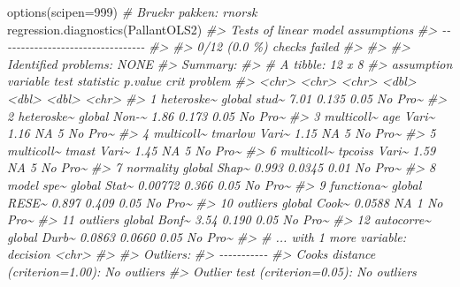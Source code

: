 \documentclass[
]{article}
\newenvironment{Shaded}{\begin{snugshade}}{\end{snugshade}}
\newcommand{\AttributeTok}[1]{\textcolor[rgb]{0.77,0.63,0.00}{#1}}
\newcommand{\CommentTok}[1]{\textcolor[rgb]{0.56,0.35,0.01}{\textit{#1}}}
\newcommand{\DecValTok}[1]{\textcolor[rgb]{0.00,0.00,0.81}{#1}}
\newcommand{\FunctionTok}[1]{\textcolor[rgb]{0.00,0.00,0.00}{#1}}
\newcommand{\NormalTok}[1]{#1}
\begin{document}
\begin{Shaded}
\begin{Highlighting}[]
\FunctionTok{options}\NormalTok{(}\AttributeTok{scipen=}\DecValTok{999}\NormalTok{)}
\CommentTok{\# Bruekr pakken: rnorsk}
\FunctionTok{regression.diagnostics}\NormalTok{(PallantOLS2)}
\CommentTok{\#\textgreater{} Tests of linear model assumptions}
\CommentTok{\#\textgreater{} {-}{-}{-}{-}{-}{-}{-}{-}{-}{-}{-}{-}{-}{-}{-}{-}{-}{-}{-}{-}{-}{-}{-}{-}{-}{-}{-}{-}{-}{-}{-}{-}{-}}
\CommentTok{\#\textgreater{} }
\CommentTok{\#\textgreater{} 0/12 (0.0 \%) checks failed}
\CommentTok{\#\textgreater{} }
\CommentTok{\#\textgreater{} }
\CommentTok{\#\textgreater{} Identified problems: NONE}
\CommentTok{\#\textgreater{} Summary:}
\CommentTok{\#\textgreater{} \# A tibble: 12 x 8}
\CommentTok{\#\textgreater{}    assumption variable test  statistic p.value  crit problem}
\CommentTok{\#\textgreater{}    \textless{}chr\textgreater{}      \textless{}chr\textgreater{}    \textless{}chr\textgreater{}     \textless{}dbl\textgreater{}   \textless{}dbl\textgreater{} \textless{}dbl\textgreater{} \textless{}chr\textgreater{}  }
\CommentTok{\#\textgreater{}  1 heteroske\textasciitilde{} global   stud\textasciitilde{}   7.01     0.135   0.05 No Pro\textasciitilde{}}
\CommentTok{\#\textgreater{}  2 heteroske\textasciitilde{} global   Non{-}\textasciitilde{}   1.86     0.173   0.05 No Pro\textasciitilde{}}
\CommentTok{\#\textgreater{}  3 multicoll\textasciitilde{} age      Vari\textasciitilde{}   1.16    NA       5    No Pro\textasciitilde{}}
\CommentTok{\#\textgreater{}  4 multicoll\textasciitilde{} tmarlow  Vari\textasciitilde{}   1.15    NA       5    No Pro\textasciitilde{}}
\CommentTok{\#\textgreater{}  5 multicoll\textasciitilde{} tmast    Vari\textasciitilde{}   1.45    NA       5    No Pro\textasciitilde{}}
\CommentTok{\#\textgreater{}  6 multicoll\textasciitilde{} tpcoiss  Vari\textasciitilde{}   1.59    NA       5    No Pro\textasciitilde{}}
\CommentTok{\#\textgreater{}  7 normality  global   Shap\textasciitilde{}   0.993    0.0345  0.01 No Pro\textasciitilde{}}
\CommentTok{\#\textgreater{}  8 model spe\textasciitilde{} global   Stat\textasciitilde{}   0.00772  0.366   0.05 No Pro\textasciitilde{}}
\CommentTok{\#\textgreater{}  9 functiona\textasciitilde{} global   RESE\textasciitilde{}   0.897    0.409   0.05 No Pro\textasciitilde{}}
\CommentTok{\#\textgreater{} 10 outliers   global   Cook\textasciitilde{}   0.0588  NA       1    No Pro\textasciitilde{}}
\CommentTok{\#\textgreater{} 11 outliers   global   Bonf\textasciitilde{}   3.54     0.190   0.05 No Pro\textasciitilde{}}
\CommentTok{\#\textgreater{} 12 autocorre\textasciitilde{} global   Durb\textasciitilde{}   0.0863   0.0660  0.05 No Pro\textasciitilde{}}
\CommentTok{\#\textgreater{} \# ... with 1 more variable: decision \textless{}chr\textgreater{}}
\CommentTok{\#\textgreater{} }
\CommentTok{\#\textgreater{} Outliers:}
\CommentTok{\#\textgreater{} {-}{-}{-}{-}{-}{-}{-}{-}{-}{-}{-}}
\CommentTok{\#\textgreater{} Cook\textquotesingle{}s distance (criterion=1.00): No outliers}
\CommentTok{\#\textgreater{} Outlier test (criterion=0.05): No outliers}
\end{Highlighting}
\end{Shaded}
\end{document}
